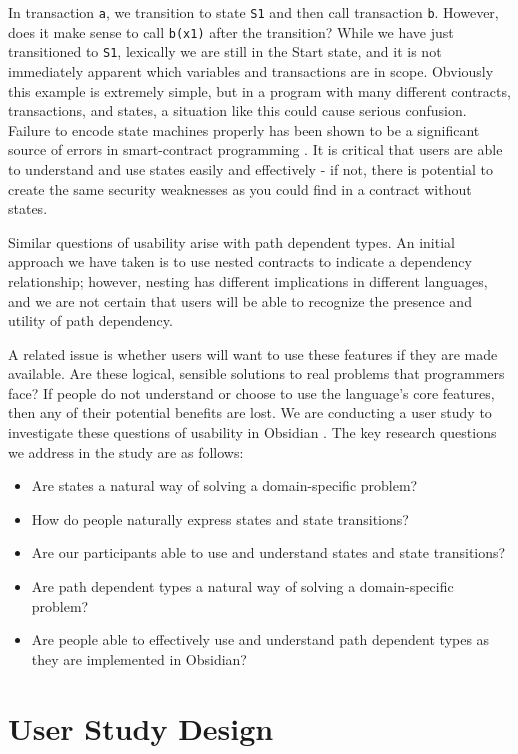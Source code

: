 \documentclass[sigplan,10pt,review,anonymous]{acmart}\settopmatter{printfolios=true}
\begin{document}
In transaction \texttt{\small{a}}, we transition to state \texttt{\small{S1}} and then call transaction \texttt{\small{b}}. 
However, does it make sense to call \texttt{\small{b(x1)}} after the transition? While we have just 
transitioned to \texttt{\small{S1}}, lexically we are still in the 
Start state, and it is not immediately apparent which variables and transactions are in scope. 
Obviously this example is extremely simple, but in a program with many different contracts, 
transactions, and states, a situation like this could cause serious confusion. Failure to encode state 
machines properly has been shown to be a significant source of errors in smart-contract 
programming \cite{Delmolino}. It is critical that users are able to understand and use states easily and 
effectively - if not, there is potential to create the same security weaknesses as you could find in a 
contract without states. 

	Similar questions of usability arise with path dependent types. An initial approach we have taken is 
to use nested contracts to indicate a dependency relationship; however, nesting has different 
implications in different languages, and we are not certain that users will be able to recognize the 
presence and utility of path dependency. 

	A related issue is whether users will want to use these features if they are made available. Are 
these logical, sensible solutions to real problems that programmers face? If people do not 
understand or choose to use the language's core features, then any of their potential benefits are 
lost. 
	We are conducting a user study to investigate these questions of usability in Obsidian \cite{Myers}. The 
key research questions we address in the study are as follows:
\begin{itemize}
\item Are states a natural way of solving a domain-specific problem?
\item How do people naturally express states and state transitions?
\item Are our participants able to use and understand states and state transitions?
\item Are path dependent types a natural way of solving a domain-specific problem?
\item Are people able to effectively use and understand path dependent types as they
are implemented in Obsidian?
\end{itemize}

\section{User Study Design}
\end{document}

